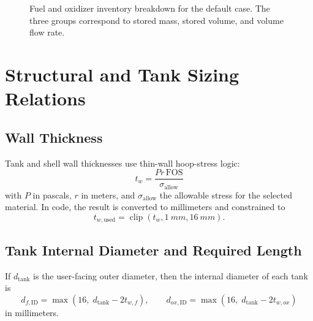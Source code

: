 \documentclass[11pt]{article}
\newcommand{\clip}{\operatorname{clip}}
\begin{document}
\begin{figure}[H]
\centering
{}
\caption{Fuel and oxidizer inventory breakdown for the default case. The three groups correspond to stored mass, stored volume, and volume flow rate.}
\end{figure}

\section{Structural and Tank Sizing Relations}
\subsection{Wall Thickness}
Tank and shell wall thicknesses use thin-wall hoop-stress logic:
\begin{equation}
t_w=\frac{Pr\,\mathrm{FOS}}{\sigma_{\text{allow}}}
\label{eq:wall-thickness}
\end{equation}
with $P$ in pascals, $r$ in meters, and $\sigma_{\text{allow}}$ the allowable stress for the selected material. In code, the result is converted to millimeters and constrained to
\begin{equation}
t_{w,\text{used}}=\clip(t_w,\SI{1}{mm},\SI{16}{mm}).
\label{eq:wall-thickness-clamped}
\end{equation}

\subsection{Tank Internal Diameter and Required Length}
If $d_{\text{tank}}$ is the user-facing outer diameter, then the internal diameter of each tank is
\begin{equation}
d_{f,\text{ID}}=\max\!\left(16,\; d_{\text{tank}}-2t_{w,f}\right),
\qquad
d_{ox,\text{ID}}=\max\!\left(16,\; d_{\text{tank}}-2t_{w,ox}\right)
\label{eq:tank-id}
\end{equation}
in millimeters.
\end{document}
